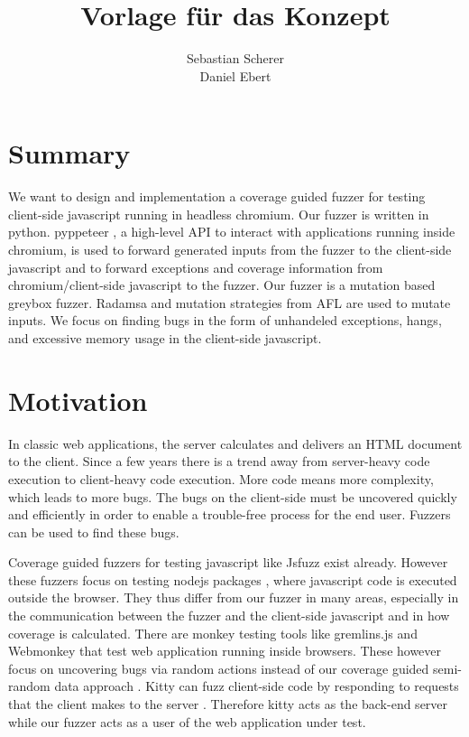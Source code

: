 \documentclass[12pt]{article}
\title{Vorlage für das Konzept}
\author{Sebastian Scherer\\
	Daniel Ebert}
\date{}
\begin{document}
	\maketitle
	
\section{Summary}
	
We want to design and implementation a coverage guided fuzzer for testing client-side javascript running in headless chromium. Our fuzzer is written in python. pyppeteer \cite{6}, a high-level API to interact with applications running inside chromium, is used to forward generated inputs from the fuzzer to the client-side javascript and to forward exceptions and coverage information from chromium/client-side javascript to the fuzzer. Our fuzzer is a mutation based greybox fuzzer. Radamsa and mutation strategies from AFL are used to mutate inputs. We focus on finding bugs in the form of unhandeled exceptions, hangs, and excessive memory usage in the client-side javascript.


\section{Motivation}

In classic web applications, the server calculates and delivers an HTML document to the client. Since a few years there is a trend away from server-heavy code execution to client-heavy code execution. More code means more complexity, which leads to more bugs. The bugs on the client-side must be uncovered quickly and efficiently in order to enable a trouble-free process for the end user. Fuzzers can be used to find these bugs.

Coverage guided fuzzers for testing javascript like Jsfuzz \cite{1} \cite{2} exist already. However these fuzzers focus on testing nodejs packages \cite{1} \cite{2}, where javascript code is executed outside the browser. They thus differ from our fuzzer in many areas, especially in the communication between the fuzzer and the client-side javascript and in how coverage is calculated. There are monkey testing tools like gremlins.js \cite{3} and Webmonkey \cite{4} that test web application running inside browsers. These however focus on uncovering bugs via random actions instead of our coverage guided semi-random data approach \cite{3} \cite{4} \cite{5}. Kitty \cite{11} can fuzz client-side code by responding to requests that the client makes to the server \cite{12}. Therefore kitty acts as the back-end server while our fuzzer acts as a user of the web application under test.
\end{document}
